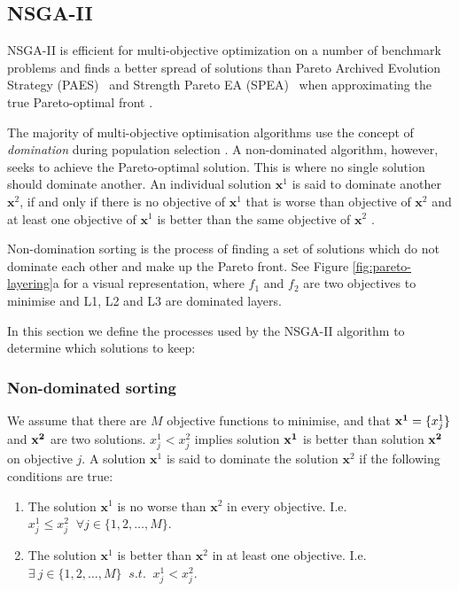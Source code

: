 \documentclass[sigconf]{acmart}
\begin{document}
\subsection{NSGA-II}


NSGA-II is efficient for multi-objective optimization on a number of benchmark problems and finds a better spread of solutions than Pareto Archived Evolution Strategy (PAES)~\cite{Knowles1999} and Strength Pareto EA (SPEA)~\cite{Zitzler2006} when approximating the true Pareto-optimal front \cite{Valkanas2014}.

The majority of multi-objective optimisation algorithms use the concept of \emph{domination} during population selection \cite{Burke2014}. A non-dominated algorithm, however, seeks to achieve the Pareto-optimal solution. This is where no single solution should dominate another. An individual solution $\mathbf{x}^{1}$ is said to dominate another $\mathbf{x}^{2}$, if and only if there is no objective of $\mathbf{x}^{1}$ that is worse than objective of $\mathbf{x}^{2}$ and at least one objective of $\mathbf{x}^{1}$ is better than the same objective of $\mathbf{x}^{2}$ \cite{Bao2017}. 


Non-domination sorting is the process of finding a set of solutions which do not dominate each other and make up the Pareto front. See Figure \ref{fig:pareto-layering}a for a visual representation, where $f_1$ and $f_2$ are two objectives to minimise and L1, L2 and L3 are dominated layers.


In this section we define the processes used by the NSGA-II algorithm to determine which solutions to keep:
\subsubsection{Non-dominated sorting}
We assume that there are $M$ objective functions to minimise, and that ${\bf x^{1}} = \{x_j^{1}\}$ and $\bf x^{2}$ are two solutions. $x_j^{1}<x_j^{2}$ implies solution $\bf x^{1}$ is better than solution $\bf x^{2}$ on objective $j$. A solution $\mathbf{x}^{1}$ is said to dominate the solution $\mathbf{x}^{2}$ if the following conditions are true:
\begin{enumerate}
  \item The solution $\mathbf{x}^{1}$ is no worse than $\mathbf{x}^{2}$ in every objective. I.e. $x^{1}_j \leq x^{2}_j \;\;  \forall j \in\{1,2,\ldots,M\}$.
  \item The solution $\mathbf{x}^{1}$ is better than $\mathbf{x}^{2}$ in at least one objective. I.e. $\exists\  {j}\in \{ 1,2,\ldots,M\} \;\; s.t. \;\;x^{1}_j < x^{2}_j$.
\end{enumerate}
\end{document}
